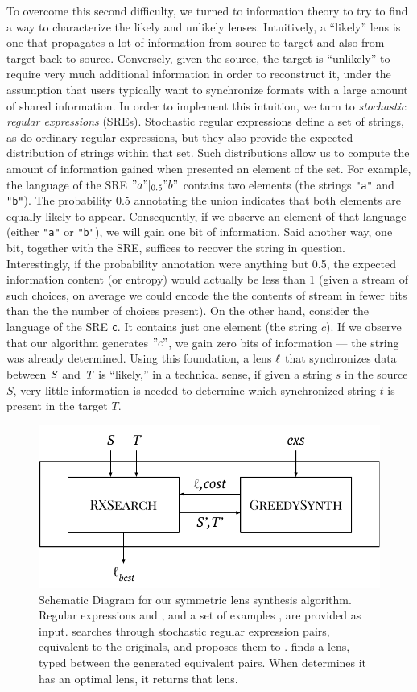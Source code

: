 \documentclass[acmsmall,screen,anonymous]{acmart}
\begin{document}
To overcome this second difficulty, we turned to information theory to try to
find a way to characterize the likely and unlikely lenses. Intuitively, a
``likely'' lens is one that propagates a lot of information from source to
target and also from target back to source. Conversely, given the source, the
target is ``unlikely'' to require very much additional information in order to
reconstruct it, under the assumption that users typically want to synchronize
formats with a large amount of shared information. In order to implement this
intuition, we turn to \emph{stochastic regular expressions} (SREs). Stochastic
regular expressions define a set of strings, as do ordinary regular expressions,
but they also provide the expected distribution of strings within that set. Such
distributions allow us to compute the amount of information gained when
presented an element of the set. For example, the language of the SRE
$\lstinline{"a"} |_{0.5}
\lstinline{"b"}$ contains two elements (the strings \lstinline{"a"} and \lstinline{"b"}).
The probability 0.5 annotating the union indicates that both elements are
equally likely to appear. Consequently, if we observe an element of that
language (either \lstinline{"a"} or
\lstinline{"b"}), we will gain one bit of information. Said another way, one bit, together with
the SRE, suffices to recover the string in question. Interestingly, if the
probability annotation were anything but 0.5, the expected information content
(or entropy) would actually be less than 1 (given a stream of such choices, on
average we could encode the the contents of stream in fewer bits than the the
number of choices present). On the other hand, consider the language of the SRE
\lstinline{c}. It contains just one element (the string $c$). If we observe that
our algorithm generates $\lstinline{"c"}$, we gain zero bits of information ---
the string was already determined. Using this foundation, a lens $\mathit{\ell}$ that
synchronizes data between $\mathit{S}$ and $\mathit{T}$ is ``likely,''
in a technical sense, if given a string $s$ in the source $S$, very little information
is needed to determine which synchronized string $t$ is present in the target
$T$.

\begin{figure}
  \includegraphics[width=.5\textwidth]{high-level-algorithm.pdf}
  \caption{Schematic Diagram for our symmetric lens synthesis algorithm. Regular
    expressions \Regex and \RegexAlt, and a set of examples \Examples, are
    provided as input. \RXSearch searches through stochastic regular expression
    pairs, equivalent to the originals, and proposes them to \GreedySynth.
    \GreedySynth finds a lens, typed between the generated equivalent pairs.
    When \RXSearch determines it has an optimal lens, it returns that lens.}
  \label{fig:high-level-algorithm}
\end{figure}
\end{document}
